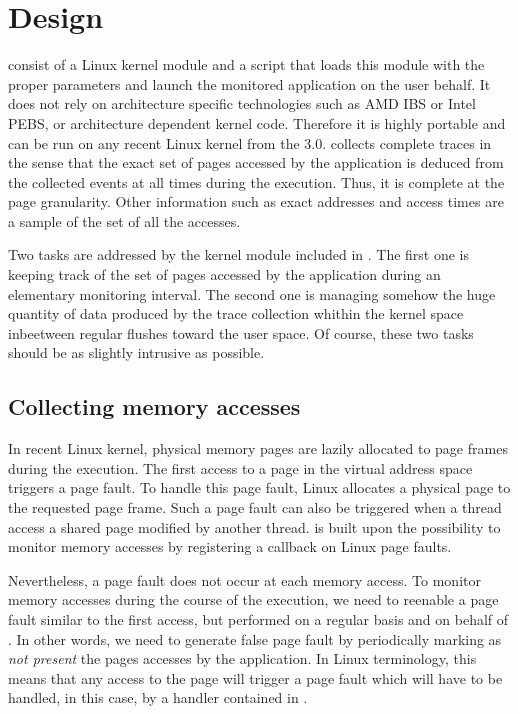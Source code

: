\section{Design}
\label{sec:design}

\Moca consist of a Linux kernel module and a script that loads this module with
the proper parameters and launch the monitored application on the user behalf.
It does not rely on architecture specific
technologies such as AMD IBS or Intel PEBS, or architecture dependent kernel
code. Therefore it is highly portable and can be run on any recent Linux kernel
from the 3.0. \Moca collects complete traces in the sense that the exact set
of pages accessed by the application is deduced from the collected events
at all times during the execution. Thus, it is complete at the page granularity.
Other information such as exact addresses and access times are a sample of
the set of all the accesses.

Two tasks are addressed by the kernel module included in \Moca. The first one is
keeping track of the set of pages accessed by the application during an elementary monitoring
interval. The second one is managing somehow the huge quantity of data produced
by the trace collection whithin the kernel space inbeetween regular flushes toward
the user space. Of course, these two tasks should be as slightly intrusive as possible.

\subsection{Collecting memory accesses}

In recent Linux kernel, physical memory pages are lazily allocated to page frames during
the execution. The first access to a page in the virtual address space triggers a page fault.
To handle this page fault, Linux allocates a physical page to the requested page frame.
Such a page fault can also be triggered when a thread access a shared page modified by
another thread. \Moca is built upon the possibility to monitor memory accesses by registering
a callback on Linux page faults.

Nevertheless, a page fault does not occur at each memory access. To monitor memory accesses during
the course of the execution, we need to reenable a page fault similar to the first access, but
performed on a regular basis and on behalf of \Moca.
In other words, we need to generate false page fault by periodically marking as \emph{not present}
the pages accesses by the application.
In Linux terminology, this means that any access to the page will trigger a page fault which
will have to be handled, in this case, by a handler contained in \Moca.

